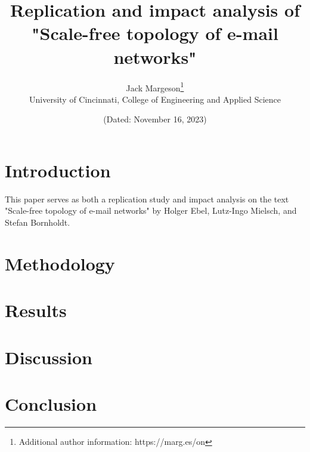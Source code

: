 \documentclass[a4paper]{article}
\title{Replication and impact analysis of\\"Scale-free topology of e-mail networks" }
\author{Jack Margeson\thanks{Additional author information: https://marg.es/on}\\
University of Cincinnati, College of Engineering and Applied Science}
\date{\normalsize{(Dated: November 16, 2023)}}
\begin{document}
\maketitle

\vspace{-3mm} %

\begin{abstract}
    \blindtext
\end{abstract}

\vspace{5mm} %

\begin{multicols}{2}

\section{Introduction}
This paper serves as both a replication study and impact analysis on the text "Scale-free topology of e-mail networks" \cite{1} by Holger Ebel, Lutz-Ingo Mielsch, and Stefan Bornholdt.


\section{Methodology}
\blindtext

\section{Results}
\blindtext

\section{Discussion}
\blindtext

\section{Conclusion}
\blindtext

\end{multicols}

\newpage
\printbibliography %
\end{document}
